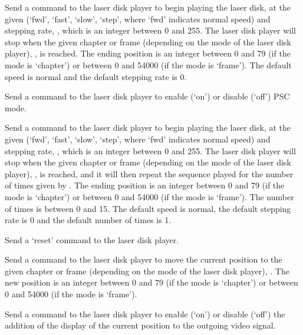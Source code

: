   Send a command to the laser disk player to begin playing the laser disk, at the given
   (`fwd', `fast', `slow', `step', where `fwd' indicates normal speed) and stepping
  rate, , which is an integer between 0 and 255.
  The laser disk player will stop when the given chapter or frame (depending on the mode of the laser
  disk player), , is reached.
  The ending position is an integer between 0 and 79 (if the mode is `chapter') or between 0 and
  54000 (if the mode is `frame').
  The default speed is normal and the default stepping rate is 0.
  
  Send a command to the laser disk player to enable (`on') or disable (`off') PSC mode.
  
  Send a command to the laser disk player to begin playing the laser disk, at the given
   (`fwd', `fast', `slow', `step', where `fwd' indicates normal speed) and stepping
  rate, , which is an integer between 0 and 255.
  The laser disk player will stop when the given chapter or frame (depending on the mode of the laser
  disk player), , is reached, and it will then repeat the sequence played for the
  number of times given by .
  The ending position is an integer between 0 and 79 (if the mode is `chapter') or between 0 and
  54000 (if the mode is `frame').
  The number of times is between 0 and 15.
  The default speed is normal, the default stepping rate is 0 and the default number of times is 1.
  
  Send a `reset' command to the laser disk player.
  
  Send a command to the laser disk player to move the current position to the given chapter or frame
  (depending on the mode of the laser disk player), .
  The new position is an integer between 0 and 79 (if the mode is `chapter') or between 0 and
  54000 (if the mode is `frame').
  
  Send a command to the laser disk player to enable (`on') or disable (`off') the addition of the
  display of the current position to the outgoing video signal.
  
